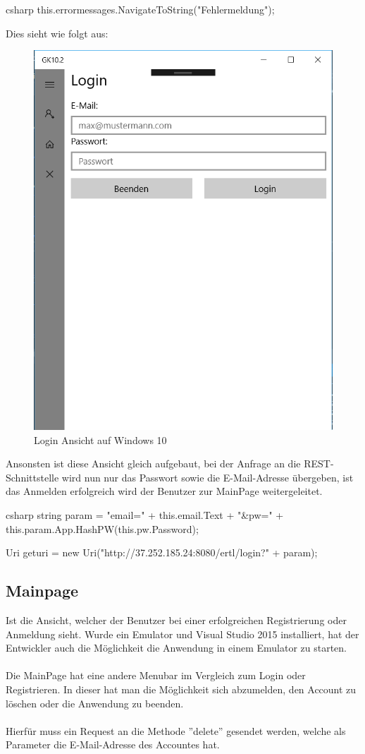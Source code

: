 \begin{code}{csharp}
	this.errormessages.NavigateToString("Fehlermeldung");
\end{code}

Dies sieht wie folgt aus:

\begin{figure}[H]
	\centering
	\includegraphics[width=0.5\linewidth]{images/screenshot005}
	\caption{Login Ansicht auf Windows 10}
	\label{fig:screenshot005}
\end{figure}

Ansonsten ist diese Ansicht gleich aufgebaut, bei der Anfrage an die REST-Schnittstelle wird nun nur das Passwort sowie die E-Mail-Adresse übergeben, ist das Anmelden erfolgreich wird der Benutzer zur MainPage weitergeleitet.

\begin{code}{csharp}
	string param = "email=" + this.email.Text + "&pw=" + this.param.App.HashPW(this.pw.Password);
	
	Uri geturi = new Uri("http://37.252.185.24:8080/ertl/login?" + param);
\end{code}

\subsection{Mainpage}

Ist die Ansicht, welcher der Benutzer bei einer erfolgreichen Registrierung oder Anmeldung sieht. Wurde ein Emulator und Visual Studio 2015 installiert, hat der Entwickler auch die Möglichkeit die Anwendung in einem Emulator zu starten.
\\\\
Die MainPage hat eine andere Menubar im Vergleich zum Login oder Registrieren. In dieser hat man die Möglichkeit sich abzumelden, den Account zu löschen oder die Anwendung zu beenden.
\\\\
Hierfür muss ein Request an die Methode ''delete'' gesendet werden, welche als Parameter die E-Mail-Adresse des Accountes hat.

